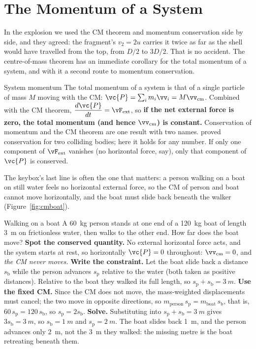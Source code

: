\section{The Momentum of a System}

In the explosion we used the CM theorem and momentum conservation side by side, and they agreed: the
fragment's $v_2=2u$ carries it twice as far as the shell would have travelled from the top, from $D/2$ to $3D/2$. That is no accident. The centre-of-mass theorem has an immediate corollary for the total
momentum of a system, and with it a second route to momentum conservation.

\begin{keybox}{System momentum}
The total momentum of a system is that of a single particle of mass $M$ moving with the CM:
$\vc{P}=\sum_i m_i\vv_i=M\vv_{\text{cm}}$. Combined with the CM theorem, $\dfrac{d\vc{P}}{dt}=\vF_{\text{ext}}$,
so \textbf{if the net external force is zero, the total momentum (and hence $\vv_{\text{cm}}$) is
constant.} Conservation of momentum and the CM theorem are one result with two names. 
proved conservation for two colliding bodies; here it holds for any number. If only one component of
$\vF_{\text{ext}}$ vanishes (no horizontal force, say), only that component of $\vc{P}$ is conserved.
\end{keybox}

The keybox's last line is often the one that matters: a person walking on a boat on still water feels no
horizontal external force, so the CM of person and boat cannot move horizontally, and the boat must slide
back beneath the walker (Figure~\ref{fig:cmboat}).

\begin{exbox}{Walking on a boat}
A \SI{60}{kg} person stands at one end of a \SI{120}{kg} boat of length \SI{3}{m} on frictionless water,
then walks to the other end. How far does the boat move?
 \textbf{Spot the conserved quantity.} No external horizontal force acts, and the system starts
at rest, so horizontally $\vc{P}=0$ throughout: $\vv_{\text{cm}}=0$, and \emph{the CM never moves.}
 \textbf{Write the constraint.} Let the boat slide back a distance $s_{\text{b}}$ while the person advances
$s_{\text{p}}$ relative to the water (both taken as positive distances). Relative to the boat they walked its full length, so
$s_{\text{p}}+s_{\text{b}}=\SI{3}{m}$.
 \textbf{Use the fixed CM.} Since the CM does not move, the mass-weighted displacements must
cancel; the two move in opposite directions, so $m_{\text{person}}\,s_{\text{p}}=m_{\text{boat}}\,s_{\text{b}}$, that is, $60\,s_{\text{p}}=120\,s_{\text{b}}$,
so $s_{\text{p}}=2s_{\text{b}}$.
 \textbf{Solve.} Substituting into $s_{\text{p}}+s_{\text{b}}=\SI{3}{m}$ gives $3s_{\text{b}}=\SI{3}{m}$, so
$s_{\text{b}}=\SI{1}{m}$ and $s_{\text{p}}=\SI{2}{m}$. The
boat slides back \SI{1}{m}, and the person advances only \SI{2}{m}, not the \SI{3}{m} they walked: the
missing metre is the boat retreating beneath them. 
\end{exbox}

